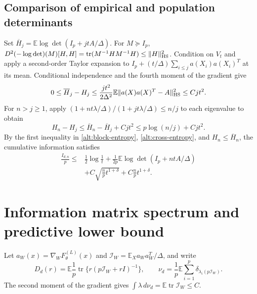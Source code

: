 \documentclass[a4paper]{tufte-handout}
\newcommand{\E}{\mathbb E}
\DeclareMathOperator{\tr}{tr}
\begin{document}
\begin{fullwidth}
\subsection{Comparison of empirical and population determinants}
Set $\overline H_j=\E\log\det(I_p+jtA/\Delta)$. For $M\succeq I_p$,
$D^2(-\log\det)(M)[H,H]=\tr(M^{-1}HM^{-1}H)\le\|H\|_{\rm HS}^2$.
Condition on $V_t$ and apply a second-order Taylor expansion to $I_p+(t/\Delta)\sum_{i\le j}a(X_i)a(X_i)^T$
at its mean. Conditional independence and the fourth moment of the gradient give
\[
 0\le\overline H_j-H_j
 \le\frac{jt^2}{2\Delta^2}\E\|a(X)a(X)^T-A\|_{\rm HS}^2\le Cjt^2.
\]
For $n>j\ge1$, apply $(1+nt\lambda/\Delta)/(1+jt\lambda/\Delta)\le n/j$ to each eigenvalue to obtain
\[
 H_n-H_j\le\overline H_n-\overline H_j+Cjt^2\le p\log(n/j)+Cjt^2.
\]
By the first inequality in \eqref{alt:block-entropy}, \eqref{alt:cross-entropy},
and $H_n\le\overline H_n$, the cumulative information satisfies
\begin{equation}\label{eq:sample-information-upper}\begin{aligned}
 \frac{I_{d,n}}p\le{}&\frac12\log\frac1t
  +\frac1{2p}\E\log\det(I_p+ntA/\Delta)\\
 &+C\sqrt{\frac np t^{1+\delta}}+C\frac np t^{1+\delta}.
\end{aligned}\end{equation}

\section{Information matrix spectrum and predictive lower bound}
Let $a_W(x)=\nabla_WF_\theta^{(L)}(x)$ and
$\mathcal I_W=\E_Xa_Wa_W^T/\Delta$, and write
\[
 D_d(r)=\E\frac1p\tr\{r(p\mathcal I_W+rI)^{-1}\},\qquad
 \nu_d=\frac1p\E\sum_{i=1}^p\delta_{\lambda_i(p\mathcal I_W)}.
\]
The second moment of the gradient gives $\int\lambda\,d\nu_d=\E\tr\mathcal I_W\le C$.


\end{fullwidth}
\end{document}
